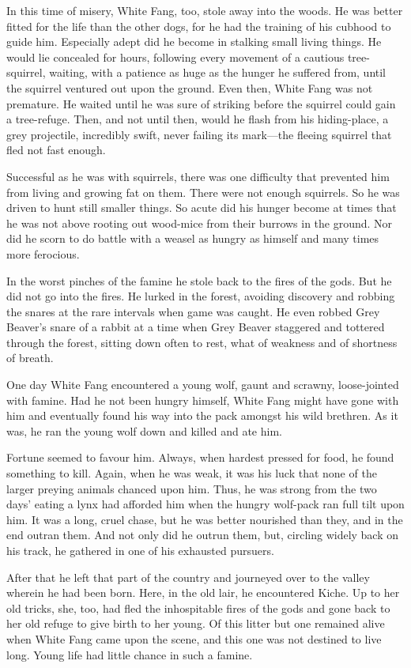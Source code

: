 \documentclass[10pt]{book}
\begin{document}
In this time of misery, White Fang, too, stole away into the woods. He
was better fitted for the life than the other dogs, for he had the
training of his cubhood to guide him. Especially adept did he become in
stalking small living things. He would lie concealed for hours,
following every movement of a cautious tree-squirrel, waiting, with a
patience as huge as the hunger he suffered from, until the squirrel
ventured out upon the ground. Even then, White Fang was not premature.
He waited until he was sure of striking before the squirrel could gain
a tree-refuge. Then, and not until then, would he flash from his
hiding-place, a grey projectile, incredibly swift, never failing its
mark—the fleeing squirrel that fled not fast enough.

Successful as he was with squirrels, there was one difficulty that
prevented him from living and growing fat on them. There were not
enough squirrels. So he was driven to hunt still smaller things. So
acute did his hunger become at times that he was not above rooting out
wood-mice from their burrows in the ground. Nor did he scorn to do
battle with a weasel as hungry as himself and many times more
ferocious.

In the worst pinches of the famine he stole back to the fires of the
gods. But he did not go into the fires. He lurked in the forest,
avoiding discovery and robbing the snares at the rare intervals when
game was caught. He even robbed Grey Beaver’s snare of a rabbit at a
time when Grey Beaver staggered and tottered through the forest,
sitting down often to rest, what of weakness and of shortness of
breath.

One day White Fang encountered a young wolf, gaunt and scrawny,
loose-jointed with famine. Had he not been hungry himself, White Fang
might have gone with him and eventually found his way into the pack
amongst his wild brethren. As it was, he ran the young wolf down and
killed and ate him.

Fortune seemed to favour him. Always, when hardest pressed for food, he
found something to kill. Again, when he was weak, it was his luck that
none of the larger preying animals chanced upon him. Thus, he was
strong from the two days’ eating a lynx had afforded him when the
hungry wolf-pack ran full tilt upon him. It was a long, cruel chase,
but he was better nourished than they, and in the end outran them. And
not only did he outrun them, but, circling widely back on his track, he
gathered in one of his exhausted pursuers.

After that he left that part of the country and journeyed over to the
valley wherein he had been born. Here, in the old lair, he encountered
Kiche. Up to her old tricks, she, too, had fled the inhospitable fires
of the gods and gone back to her old refuge to give birth to her young.
Of this litter but one remained alive when White Fang came upon the
scene, and this one was not destined to live long. Young life had
little chance in such a famine.
\end{document}

